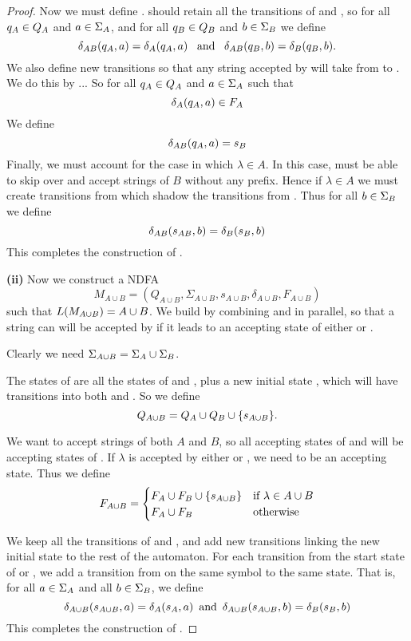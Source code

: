 \documentclass{bcthesis}
\renewcommand{\meo}{}
\begin{document}
\begin{proof}
		Now we must define \dalab.
		\mab should retain all the transitions of \ma and \mb, so for all $q_A \in Q_A$ and $a \in \Sigma_A$, and for all $q_B \in Q_B$ and $b \in \Sigma_B$ we define
		\[
			\delta_{AB}(q_A, a) = \delta_A(q_A, a) \enspace \text{ and } \enspace \delta_{AB}(q_B, b) = \delta_B(q_B, b).
		\]
		We also define new transitions so that any string accepted by \ma will take \mab from \sab to \sb.
		\meo{We do this by ...}
		So for all $q_A \in Q_A$ and $a \in \Sigma_A$ such that 
		\[
			\delta_A(q_A, a) \in F_A
		\]
		We define
		\[
			\delta_{AB}(q_A, a) = s_B
		\]
		Finally, we must account for the case in which $\lambda \in A$.
		In this case, \mab must be able to skip over \ma and accept strings of $B$ without any prefix.
		Hence if $\lambda \in A$ we must create transitions from \sab which shadow the transitions from \sb.
		Thus for all $b \in \Sigma_B$ we define
		\[
			\delta_{AB}(s_{AB}, b) = \delta_B(s_B, b)
		\]
		This completes the construction of \mab.

		\noindent \textbf{(ii)} \hspace{\parindent}
		Now we construct a NDFA 
		\[
			M_{A \cup B} = (Q_{A \cup B}, \Sigma_{A \cup B}, s_{A \cup B}, \delta_{A \cup B}, F_{A \cup B})
		\] 
		such that $L(M_{A \cup B}) = A \cup B$.
		We build \maub by combining \ma and \mb in parallel, so that a string can will be accepted by \maub if it leads to an accepting state of either \ma or \mb.
		
		Clearly we need $\Sigma_{A \cup B} = \Sigma_A \cup \Sigma_B$.

		The states of \maub are all the states of \ma and \mb, plus a new initial state \saub, which will have transitions into both \ma and \mb.
		So we define 
		\[
			Q_{A \cup B} = Q_A \cup Q_B \cup \{ s_{A \cup B} \}.
		\]

		We want \maub to accept strings of both $A$ and $B$, so all accepting states of \ma and \mb will be accepting states of \maub.
		If $\lambda$ is accepted by either \ma or \mb, we need \saub to be an accepting state. 
		Thus we define 
		\[
			F_{A \cup B} =	\begin{cases}
						F_A \cup F_B \cup \{ s_{A \cup B} \} &\text{if } \lambda \in A \cup B \\
						F_A \cup F_B &\text{otherwise}
					\end{cases}
		\]

		We keep all the transitions of \ma and \mb, and add new transitions linking the new initial state to the rest of the automaton.
		For each transition from the start state of \ma or \mb, we add a transition from \saub on the same symbol to the same state.
		That is, for all $a \in \Sigma_A$ and all $b \in \Sigma_B$, we define
		\[
			\delta_{A \cup B}(s_{A \cup B}, a) = \delta_A(s_A, a) \enspace \text{and} \enspace \delta_{A \cup B}(s_{A \cup B}, b) = \delta_B(s_B, b)
		\]
		This completes the construction of \maub.


\end{proof}
\end{document}
